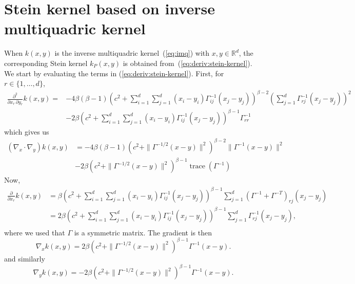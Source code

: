\documentclass[11pt,a4paper]{report}
\DeclareMathOperator{\trace}{trace}
\begin{document}
\section{Stein kernel based on inverse multiquadric kernel}
\label{appendix:derivations:imq-stein}

When $k(x,y)$ is the inverse multiquadric kernel~(\ref{eq:imq}) with $x, y \in \mathbb{R}^d$, the corresponding Stein kernel $k_P(x, y)$ is obtained from~(\ref{eq:deriv:stein-kernel}). We start by evaluating the terms in (\ref{eq:deriv:stein-kernel}). First, for $r \in \{1, \dots, d\}$,
\begin{equation}
\begin{aligned}
\frac{\partial^2}{\partial x_r\,\partial y_r} k(x,y) 
= &-4 \beta(\beta-1) \left(c^2 + \sum_{i=1}^d\sum_{j=1}^d (x_i-y_i) \Gamma^{-1}_{ij}(x_j-y_j)\right)^{\beta-2} \left(\sum_{j=1}^d \Gamma^{-1}_{rj}(x_j - y_j)\right)^2 \\
&- 2\beta \left(c^2 + \sum_{i=1}^d\sum_{j=1}^d (x_i-y_i) \Gamma^{-1}_{ij}(x_j-y_j)\right)^{\beta-1} \Gamma^{-1}_{rr}
\end{aligned}
\end{equation}
which gives us
\begin{equation}
\begin{aligned}
(\nabla_x \cdot \nabla_y) k(x,y) 
&= -4 \beta(\beta-1) \left(c^2 + \| \Gamma^{-1/2}(x-y)\|^2\right)^{\beta-2} \| \Gamma^{-1}(x - y)\|^2 \\
&- 2\beta \left(c^2 + \|\Gamma^{-1/2}(x-y)\|^2\right)^{\beta-1} \trace(\Gamma^{-1})
\label{eq:appx:deriv:nablax_nablay}
\end{aligned}
\end{equation}
Now,
\begin{equation}
\begin{aligned}
\frac{\partial}{\partial x_r} k(x,y) 
&= \beta \left(c^2 + \sum_{i=1}^d\sum_{j=1}^d (x_i-y_i) \Gamma^{-1}_{ij}(x_j-y_j)\right)^{\beta-1}
\sum_{j=1}^d (\Gamma^{-1} + \Gamma^{-T})_{rj}(x_j - y_j) \\
&= 2 \beta \left(c^2 + \sum_{i=1}^d\sum_{j=1}^d (x_i-y_i) \Gamma^{-1}_{ij}(x_j-y_j)\right)^{\beta-1}
\sum_{j=1}^d \Gamma^{-1}_{rj}(x_j - y_j), \\
\end{aligned}
\end{equation}
where we used that $\Gamma$ is a symmetric matrix. The gradient is then
\begin{equation}
\nabla_x k(x,y) = 2 \beta \left(c^2 + \| \Gamma^{-1/2} (x-y)\|^2\right)^{\beta-1} \Gamma^{-1} (x - y).
\label{eq:appx:deviv:nablax}
\end{equation}
and similarly
\begin{equation}
\nabla_y k(x,y) = -2 \beta \left(c^2 + \| \Gamma^{-1/2} (x-y)\|^2\right)^{\beta-1} \Gamma^{-1} (x - y).
\label{eq:appx:deviv:nablay}
\end{equation}
\end{document}
